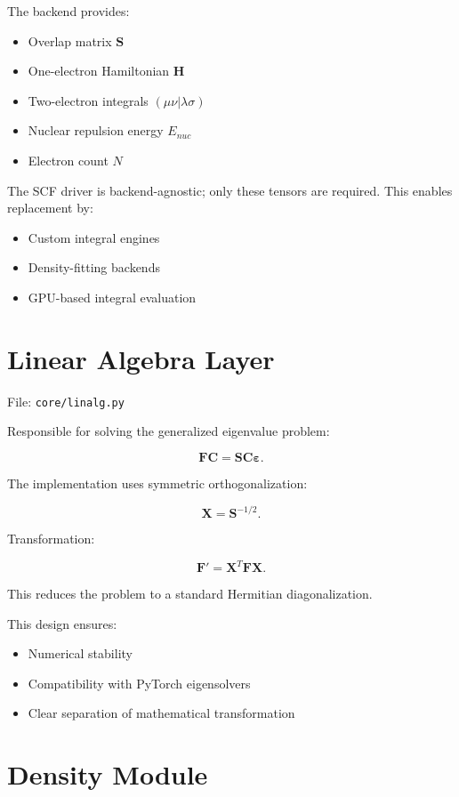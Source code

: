 \documentclass[11pt]{article}
\begin{document}
The backend provides:

\begin{itemize}
\item Overlap matrix $\mathbf{S}$
\item One-electron Hamiltonian $\mathbf{H}$
\item Two-electron integrals $(\mu\nu|\lambda\sigma)$
\item Nuclear repulsion energy $E_{nuc}$
\item Electron count $N$
\end{itemize}

The SCF driver is backend-agnostic; only these tensors are required.
This enables replacement by:

\begin{itemize}
\item Custom integral engines
\item Density-fitting backends
\item GPU-based integral evaluation
\end{itemize}

\section{Linear Algebra Layer}

File: \texttt{core/linalg.py}

Responsible for solving the generalized eigenvalue problem:

\[
\mathbf{F}\mathbf{C} = \mathbf{S}\mathbf{C}\bm{\varepsilon}.
\]

The implementation uses symmetric orthogonalization:

\[
\mathbf{X} = \mathbf{S}^{-1/2}.
\]

Transformation:

\[
\mathbf{F}' = \mathbf{X}^T \mathbf{F} \mathbf{X}.
\]

This reduces the problem to a standard Hermitian diagonalization.

This design ensures:

\begin{itemize}
\item Numerical stability
\item Compatibility with PyTorch eigensolvers
\item Clear separation of mathematical transformation
\end{itemize}

\section{Density Module}
\end{document}
